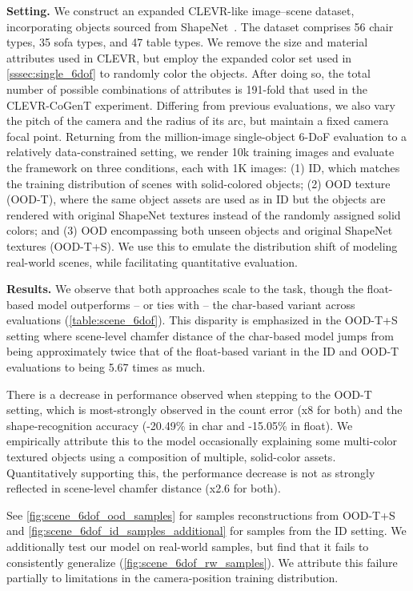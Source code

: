 \noindent\textbf{Setting.}
We construct an expanded CLEVR-like image--scene dataset, incorporating objects sourced from ShapeNet~\citep{shapenet2015}.
The dataset comprises 56 chair types, 35 sofa types, and 47 table types.
We remove the size and material attributes used in CLEVR, but employ the expanded color set used in \cref{sssec:single_6dof} to randomly color the objects.
After doing so, the total number of possible combinations of attributes is 191-fold that used in the CLEVR-CoGenT experiment.
Differing from previous evaluations, we also vary the pitch of the camera and the radius of its arc, but maintain a fixed camera focal point.
Returning from the million-image single-object 6-DoF evaluation to a relatively data-constrained setting, we render 10k training images and evaluate the framework on three conditions, each with 1K images:
(1) ID, which matches the training distribution of scenes with solid-colored objects;
(2) OOD texture (OOD-T), where the same object assets are used as in ID but the objects are rendered with original ShapeNet textures instead of the randomly assigned solid colors;
and (3) OOD encompassing both unseen objects and original ShapeNet textures (OOD-T+S). We use this to emulate the distribution shift of modeling real-world scenes, while facilitating quantitative evaluation.

\noindent\textbf{Results.}
We observe that both approaches scale to the task, though the float-based model outperforms -- or ties with -- the char-based variant across evaluations (\cref{table:scene_6dof}).
This disparity is emphasized in the OOD-T+S setting where scene-level chamfer distance of the char-based model jumps from being approximately twice that of the float-based variant in the ID and OOD-T evaluations to being 5.67 times as much.

There is a decrease in performance observed when stepping to the OOD-T setting, which is most-strongly observed in the count error (x8 for both) and the shape-recognition accuracy (-20.49\% in char and -15.05\% in float).
We empirically attribute this to the model occasionally explaining some multi-color textured objects using a composition of multiple, solid-color assets.
Quantitatively supporting this, the performance decrease is not as strongly reflected in scene-level chamfer distance (x2.6 for both).

See \cref{fig:scene_6dof_ood_samples} for samples reconstructions from OOD-T+S and \cref{fig:scene_6dof_id_samples_additional} for samples from the ID setting.
We additionally test our model on real-world samples, but find that it fails to consistently generalize (\cref{fig:scene_6dof_rw_samples}).
We attribute this failure partially to limitations in the camera-position training distribution.